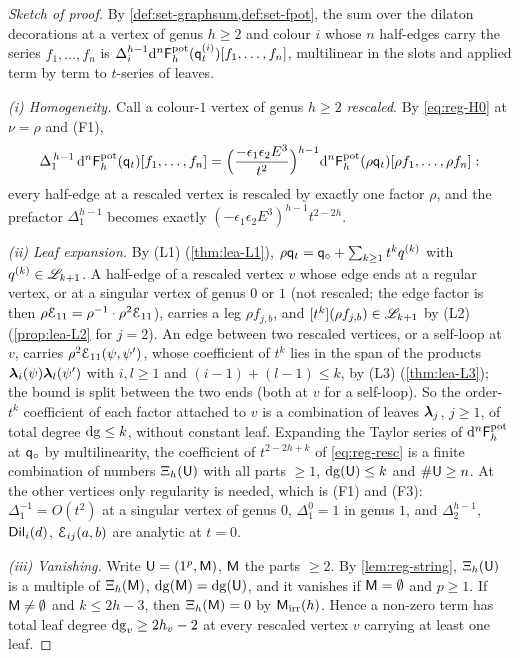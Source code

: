\begin{proof}[Sketch of proof]
By \cref{def:set-graphsum,def:set-fpot}, the sum over the dilaton decorations at a vertex of genus $h\geq2$ and colour $i$ whose $n$ half-edges carry the series $f_1,\dots,f_n$ is $\Delta_i^{h-1}\mathrm{d}^n\mathsf{F}^{\mathrm{pot}}_h(\mathsf{q}_{t}^{(i)})[f_1,\dots,f_n]$, multilinear in the slots and applied term by term to $t$-series of leaves.

\emph{(i) Homogeneity.} Call a colour-$1$ vertex of genus $h\geq2$ \emph{rescaled}. By \eqref{eq:reg-H0} at $\nu=\rho$ and (F1),
\begin{equation}
\label{eq:reg-resc}
\Delta_1^{\,h-1}\,\mathrm{d}^n\mathsf{F}^{\mathrm{pot}}_h(\mathsf{q}_{t})[f_1,\dots,f_n]
=\Big(\frac{-\epsilon_1\epsilon_2E^3}{t^2}\Big)^{h-1}\mathrm{d}^n\mathsf{F}^{\mathrm{pot}}_h(\rho\mathsf{q}_{t})[\rho f_1,\dots,\rho f_n]:
\end{equation}
every half-edge at a rescaled vertex is rescaled by exactly one factor $\rho$, and the prefactor $\Delta_1^{h-1}$ becomes exactly $(-\epsilon_1\epsilon_2E^3)^{h-1}t^{2-2h}$.

\emph{(ii) Leaf expansion.} By (L1) (\cref{thm:lea-L1}), $\rho\mathsf{q}_{t}=\mathsf{q}_{\circ}+\sum_{k\geq1}t^kq^{(k)}$ with $q^{(k)}\in\mathscr{L}_{k+1}$. A half-edge of a rescaled vertex $v$ whose edge ends at a regular vertex, or at a singular vertex of genus $0$ or $1$ (not rescaled; the edge factor is then $\rho\mathcal{E}_{11}=\rho^{-1}\cdot\rho^2\mathcal{E}_{11}$), carries a leg $\rho f_{j,b}$, and $[t^k](\rho f_{j,b})\in\mathscr{L}_{k+1}$ by (L2) (\cref{prop:lea-L2} for $j=2$). An edge between two rescaled vertices, or a self-loop at $v$, carries $\rho^2\mathcal{E}_{11}(\psi,\psi')$, whose coefficient of $t^k$ lies in the span of the products $\boldsymbol{\lambda}_i(\psi)\boldsymbol{\lambda}_l(\psi')$ with $i,l\geq1$ and $(i-1)+(l-1)\leq k$, by (L3) (\cref{thm:lea-L3}); the bound is split between the two ends (both at $v$ for a self-loop). So the order-$t^k$ coefficient of each factor attached to $v$ is a combination of leaves $\boldsymbol{\lambda}_j$, $j\geq1$, of total degree $\mathrm{dg}\leq k$, without constant leaf. Expanding the Taylor series of $\mathrm{d}^n\mathsf{F}^{\mathrm{pot}}_h$ at $\mathsf{q}_{\circ}$ by multilinearity, the coefficient of $t^{2-2h+k}$ of \eqref{eq:reg-resc} is a finite combination of numbers $\Xi_h(\mathsf{U})$ with all parts $\geq1$, $\mathrm{dg}(\mathsf{U})\leq k$ and $\#\mathsf{U}\geq n$. At the other vertices only regularity is needed, which is (F1) and (F3): $\Delta_1^{-1}=O(t^2)$ at a singular vertex of genus $0$, $\Delta_1^0=1$ in genus $1$, and $\Delta_2^{h-1}$, $\mathsf{Dil}_i(d)$, $\mathcal{E}_{ij}(a,b)$ are analytic at $t=0$.

\emph{(iii) Vanishing.} Write $\mathsf{U}=(1^p,\mathsf{M})$, $\mathsf{M}$ the parts $\geq2$. By \cref{lem:reg-string}, $\Xi_h(\mathsf{U})$ is a multiple of $\Xi_h(\mathsf{M})$, $\mathrm{dg}(\mathsf{M})=\mathrm{dg}(\mathsf{U})$, and it vanishes if $\mathsf{M}=\emptyset$ and $p\geq1$. If $\mathsf{M}\neq\emptyset$ and $k\leq2h-3$, then $\Xi_h(\mathsf{M})=0$ by $\mathsf{M}_{\mathrm{irr}}(h)$. Hence a non-zero term has total leaf degree $\mathrm{dg}_v\geq2h_v-2$ at every rescaled vertex $v$ carrying at least one leaf.


\end{proof}
